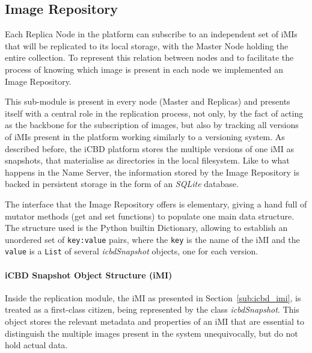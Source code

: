 \subsection{Image Repository}
\label{sub:impl_icbdrep_image_repo}

Each Replica Node in the platform can subscribe to an independent set of iMIs that will be replicated to its local storage, with the Master Node holding the entire collection. 
To represent this relation between nodes and to facilitate the process of knowing which image is present in each node we implemented an Image Repository.

This sub-module is present in every node (Master and Replicas) and presents itself with a central role in the replication process, not only, by the fact of acting as the backbone for the subscription of images, but also by tracking all versions of iMIs present in the platform working similarly to a versioning system. As described before, the iCBD platform stores the multiple versions of one iMI as snapshots, that materialise as directories in the local filesystem. Like to what happens in the Name Server, the information stored by the Image Repository is backed in persistent storage in the form of an \textit{SQLite} database. 

The interface that the Image Repository offers is elementary, giving a hand full of mutator methods (get and set functions) to populate one main data structure. The structure used is the Python builtin Dictionary, allowing to establish an unordered set of \texttt{key:value} pairs, where the \texttt{key} is the name of the iMI and the \texttt{value} is a \texttt{List} of several \textit{icbdSnapshot} objects, one for each version.

\paragraph{iCBD Snapshot Object Structure (iMI)}
\label{par:impl_icbdrep_snapshot}

Inside the replication module, the iMI as presented in Section~\ref{sub:icbd_imi}, is treated as a first-class citizen, being represented by the class \textit{icbdSnapshot}. This object stores the relevant metadata and properties of an iMI that are essential to distinguish the multiple images present in the system unequivocally, but do not hold actual data.

